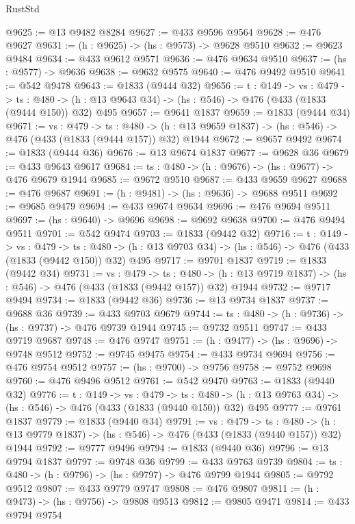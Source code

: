 \begin{lexlean}{RustStd}
\begin{coremodule}
@9625 := @13 @9482 @8284
@9627 := @433 @9596 @9564
@9628 := @476 @9627
@9631 := (h : @9625) -> (hs : @9573) -> @9628 @9510
@9632 := @9623 @9484
@9634 := @433 @9612 @9571
@9636 := @476 @9634 @9510
@9637 := (hs : @9577) -> @9636
@9638 := @9632 @9575
@9640 := @476 @9492 @9510
@9641 := @542 @9478
@9643 := @1833 (@9444 @32)
@9656 := {t : @149} ->
  {vs : @479} ->
  {ts : @480} -> (h : @13 @9643 @34) -> (hs : @546) -> @476 (@433 (@1833 (@9444 @150)) @32) @495
@9657 := @9641 @1837
@9659 := @1833 (@9444 @34)
@9671 := {vs : @479} ->
  {ts : @480} -> (h : @13 @9659 @1837) -> (hs : @546) -> @476 (@433 (@1833 (@9444 @157)) @32) @1944
@9672 := @9657 @9492
@9674 := @1833 (@9444 @36)
@9676 := @13 @9674 @1837
@9677 := @9628 @36
@9679 := @433 @9643 @9617
@9684 := {ts : @480} -> (h : @9676) -> (hs : @9677) -> @476 @9679 @1944
@9685 := @9672 @9510
@9687 := @433 @9659 @9627
@9688 := @476 @9687
@9691 := (h : @9481) -> (hs : @9636) -> @9688 @9511
@9692 := @9685 @9479
@9694 := @433 @9674 @9634
@9696 := @476 @9694 @9511
@9697 := (hs : @9640) -> @9696
@9698 := @9692 @9638
@9700 := @476 @9494 @9511
@9701 := @542 @9474
@9703 := @1833 (@9442 @32)
@9716 := {t : @149} ->
  {vs : @479} ->
  {ts : @480} -> (h : @13 @9703 @34) -> (hs : @546) -> @476 (@433 (@1833 (@9442 @150)) @32) @495
@9717 := @9701 @1837
@9719 := @1833 (@9442 @34)
@9731 := {vs : @479} ->
  {ts : @480} -> (h : @13 @9719 @1837) -> (hs : @546) -> @476 (@433 (@1833 (@9442 @157)) @32) @1944
@9732 := @9717 @9494
@9734 := @1833 (@9442 @36)
@9736 := @13 @9734 @1837
@9737 := @9688 @36
@9739 := @433 @9703 @9679
@9744 := {ts : @480} -> (h : @9736) -> (hs : @9737) -> @476 @9739 @1944
@9745 := @9732 @9511
@9747 := @433 @9719 @9687
@9748 := @476 @9747
@9751 := (h : @9477) -> (hs : @9696) -> @9748 @9512
@9752 := @9745 @9475
@9754 := @433 @9734 @9694
@9756 := @476 @9754 @9512
@9757 := (hs : @9700) -> @9756
@9758 := @9752 @9698
@9760 := @476 @9496 @9512
@9761 := @542 @9470
@9763 := @1833 (@9440 @32)
@9776 := {t : @149} ->
  {vs : @479} ->
  {ts : @480} -> (h : @13 @9763 @34) -> (hs : @546) -> @476 (@433 (@1833 (@9440 @150)) @32) @495
@9777 := @9761 @1837
@9779 := @1833 (@9440 @34)
@9791 := {vs : @479} ->
  {ts : @480} -> (h : @13 @9779 @1837) -> (hs : @546) -> @476 (@433 (@1833 (@9440 @157)) @32) @1944
@9792 := @9777 @9496
@9794 := @1833 (@9440 @36)
@9796 := @13 @9794 @1837
@9797 := @9748 @36
@9799 := @433 @9763 @9739
@9804 := {ts : @480} -> (h : @9796) -> (hs : @9797) -> @476 @9799 @1944
@9805 := @9792 @9512
@9807 := @433 @9779 @9747
@9808 := @476 @9807
@9811 := (h : @9473) -> (hs : @9756) -> @9808 @9513
@9812 := @9805 @9471
@9814 := @433 @9794 @9754

\end{coremodule}
\end{lexlean}
